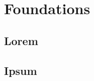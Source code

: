 \documentclass[oneside,11pt]{memoir}
\begin{document}
\lipsum[1-3]


\part{Foundations}



\chapter{Lorem}

\cite{arxiv-1907.07174}

\lipsum[1-3]

\chapter{Ipsum}

\end{document}
